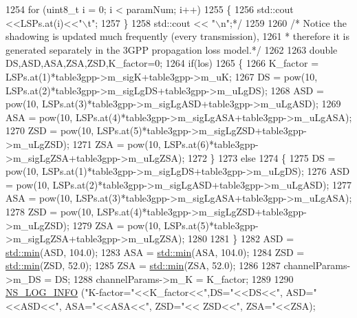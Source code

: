 \begin{DoxyCode}
1254 \textcolor{comment}{        for (uint8\_t i = 0; i < paramNum; i++)}
1255 \textcolor{comment}{        \{}
1256 \textcolor{comment}{                std::cout <<LSPs.at(i)<<"\(\backslash\)t";}
1257 \textcolor{comment}{        \}}
1258 \textcolor{comment}{        std::cout << "\(\backslash\)n";*/}
1259 
1260         \textcolor{comment}{/* Notice the shadowing is updated much frequently (every transmission),}
1261 \textcolor{comment}{         * therefore it is generated separately in the 3GPP propagation loss model.*/}
1262 
1263         \textcolor{keywordtype}{double} DS,ASD,ASA,ZSA,ZSD,K\_factor=0;
1264         \textcolor{keywordflow}{if}(los)
1265         \{
1266                 K\_factor = LSPs.at(1)*table3gpp->m\_sigK+table3gpp->m\_uK;
1267                 DS = pow(10, LSPs.at(2)*table3gpp->m\_sigLgDS+table3gpp->m\_uLgDS);
1268                 ASD = pow(10, LSPs.at(3)*table3gpp->m\_sigLgASD+table3gpp->m\_uLgASD);
1269                 ASA = pow(10, LSPs.at(4)*table3gpp->m\_sigLgASA+table3gpp->m\_uLgASA);
1270                 ZSD = pow(10, LSPs.at(5)*table3gpp->m\_sigLgZSD+table3gpp->m\_uLgZSD);
1271                 ZSA = pow(10, LSPs.at(6)*table3gpp->m\_sigLgZSA+table3gpp->m\_uLgZSA);
1272         \}
1273         \textcolor{keywordflow}{else}
1274         \{
1275                 DS = pow(10, LSPs.at(1)*table3gpp->m\_sigLgDS+table3gpp->m\_uLgDS);
1276                 ASD = pow(10, LSPs.at(2)*table3gpp->m\_sigLgASD+table3gpp->m\_uLgASD);
1277                 ASA = pow(10, LSPs.at(3)*table3gpp->m\_sigLgASA+table3gpp->m\_uLgASA);
1278                 ZSD = pow(10, LSPs.at(4)*table3gpp->m\_sigLgZSD+table3gpp->m\_uLgZSD);
1279                 ZSA = pow(10, LSPs.at(5)*table3gpp->m\_sigLgZSA+table3gpp->m\_uLgZSA);
1280 
1281         \}
1282         ASD = \hyperlink{80211b_8c_ac6afabdc09a49a433ee19d8a9486056d}{std::min}(ASD, 104.0);
1283         ASA = \hyperlink{80211b_8c_ac6afabdc09a49a433ee19d8a9486056d}{std::min}(ASA, 104.0);
1284         ZSD = \hyperlink{80211b_8c_ac6afabdc09a49a433ee19d8a9486056d}{std::min}(ZSD, 52.0);
1285         ZSA = \hyperlink{80211b_8c_ac6afabdc09a49a433ee19d8a9486056d}{std::min}(ZSA, 52.0);
1286 
1287         channelParams->m\_DS = DS;
1288         channelParams->m\_K = K\_factor;
1289 
1290         \hyperlink{group__logging_gafbd73ee2cf9f26b319f49086d8e860fb}{NS\_LOG\_INFO} (\textcolor{stringliteral}{"K-factor="}<<K\_factor<<\textcolor{stringliteral}{",DS="}<<DS<<\textcolor{stringliteral}{", ASD="}<<ASD<<\textcolor{stringliteral}{", ASA="}<<ASA<<\textcolor{stringliteral}{", ZSD="}<<
      ZSD<<\textcolor{stringliteral}{", ZSA="}<<ZSA);

\end{DoxyCode}
